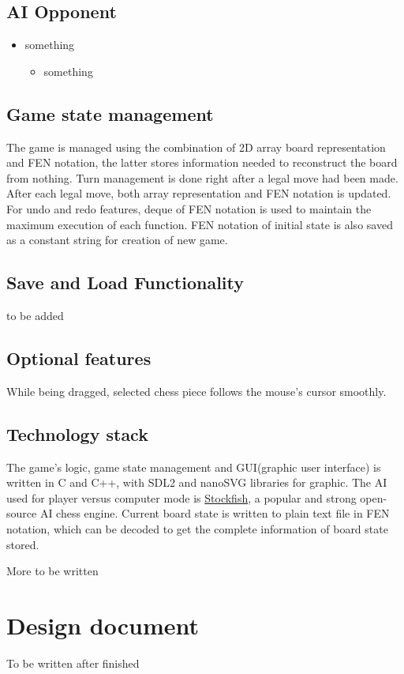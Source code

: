 \documentclass[a4paper, 10pt, titlepage]{article}
\begin{document}
\subsection{AI Opponent}
\begin{itemize}
    \item something
          \begin{itemize}
              \item something
          \end{itemize}
\end{itemize}
\subsection{Game state management}
The game is managed using the combination of 2D array board representation and FEN notation, the latter stores information needed to reconstruct the board from nothing. Turn management is done right after a legal move had been made. After each legal move, both array representation and FEN notation is updated. For undo and redo features, deque of FEN notation is used to maintain the maximum execution of each function. FEN notation of initial state is also saved as a constant string for creation of new game.

\subsection{Save and Load Functionality}
to be added
\subsection{Optional features}
While being dragged, selected chess piece follows the mouse's cursor smoothly.
\subsection{Technology stack}
The game's logic, game state management and GUI(graphic user interface) is written in C and C++, with SDL2 and nanoSVG libraries for graphic. The AI used for player versus computer mode is \href{https://github.com/official-stockfish/Stockfish}{Stockfish}, a popular and strong open-source AI chess engine. Current board state is written to plain text file in FEN notation, which can be decoded to get the complete information of board state stored. 

More to be written
\section{Design document}
To be written after finished
\end{document}
